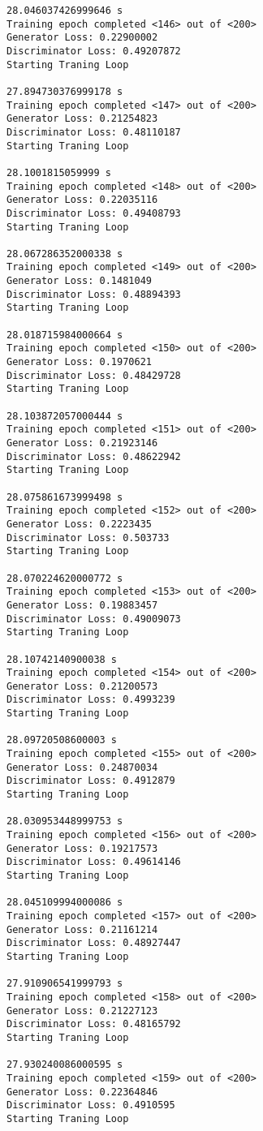 \documentclass[11pt]{article}
\begin{document}
\begin{Verbatim}[commandchars=\\\{\}]
28.046037426999646 s
Training epoch completed <146> out of <200>
Generator Loss: 0.22900002
Discriminator Loss: 0.49207872
Starting Traning Loop 

27.894730376999178 s
Training epoch completed <147> out of <200>
Generator Loss: 0.21254823
Discriminator Loss: 0.48110187
Starting Traning Loop 

28.1001815059999 s
Training epoch completed <148> out of <200>
Generator Loss: 0.22035116
Discriminator Loss: 0.49408793
Starting Traning Loop 

28.067286352000338 s
Training epoch completed <149> out of <200>
Generator Loss: 0.1481049
Discriminator Loss: 0.48894393
Starting Traning Loop 

28.018715984000664 s
Training epoch completed <150> out of <200>
Generator Loss: 0.1970621
Discriminator Loss: 0.48429728
Starting Traning Loop 

28.103872057000444 s
Training epoch completed <151> out of <200>
Generator Loss: 0.21923146
Discriminator Loss: 0.48622942
Starting Traning Loop 

28.075861673999498 s
Training epoch completed <152> out of <200>
Generator Loss: 0.2223435
Discriminator Loss: 0.503733
Starting Traning Loop 

28.070224620000772 s
Training epoch completed <153> out of <200>
Generator Loss: 0.19883457
Discriminator Loss: 0.49009073
Starting Traning Loop 

28.10742140900038 s
Training epoch completed <154> out of <200>
Generator Loss: 0.21200573
Discriminator Loss: 0.4993239
Starting Traning Loop 

28.09720508600003 s
Training epoch completed <155> out of <200>
Generator Loss: 0.24870034
Discriminator Loss: 0.4912879
Starting Traning Loop 

28.030953448999753 s
Training epoch completed <156> out of <200>
Generator Loss: 0.19217573
Discriminator Loss: 0.49614146
Starting Traning Loop 

28.045109994000086 s
Training epoch completed <157> out of <200>
Generator Loss: 0.21161214
Discriminator Loss: 0.48927447
Starting Traning Loop 

27.910906541999793 s
Training epoch completed <158> out of <200>
Generator Loss: 0.21227123
Discriminator Loss: 0.48165792
Starting Traning Loop 

27.930240086000595 s
Training epoch completed <159> out of <200>
Generator Loss: 0.22364846
Discriminator Loss: 0.4910595
Starting Traning Loop 


\end{Verbatim}
\end{document}
